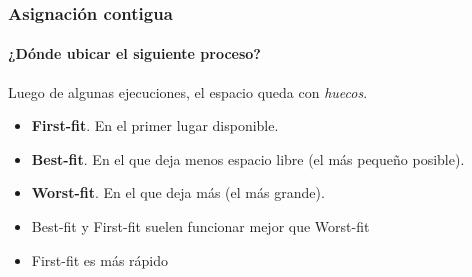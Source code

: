 \documentclass[letter]{beamer}
\begin{document}
%
%  
%  
%
%  
%  
%
\begin{frame}
  \frametitle{Asignación contigua}
  \framesubtitle{¿Dónde ubicar el siguiente proceso?}

  Luego de algunas ejecuciones, el espacio queda con {\em huecos}.

  
  \begin{itemize}
    \item<4->{\bf First-fit}. En el primer lugar disponible.
    \item<4->{\bf Best-fit}. En el que deja menos espacio libre (el más pequeño posible).
    \item<4->{\bf Worst-fit}. En el que deja más (el más grande).
  \end{itemize}
  
  \begin{itemize}
    \item <5-> Best-fit y First-fit suelen funcionar mejor que Worst-fit
    \item <5-> First-fit es más rápido
  \end{itemize}
\end{frame}
\end{document}
